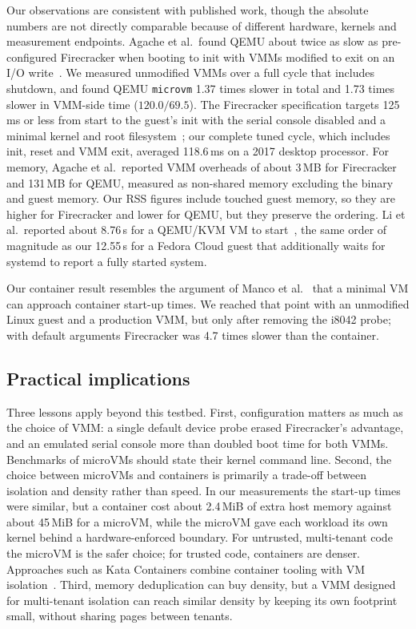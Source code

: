 \documentclass[pdflatex,sn-mathphys-num]{sn-jnl}%
\begin{document}
Our observations are consistent with published work, though the absolute numbers are not directly comparable because of different hardware, kernels and measurement endpoints. Agache et al.\ found QEMU about twice as slow as pre-configured Firecracker when booting to init with VMMs modified to exit on an I/O write~\cite{agache2020firecracker}. We measured unmodified VMMs over a full cycle that includes shutdown, and found QEMU \texttt{microvm} 1.37 times slower in total and 1.73 times slower in VMM-side time ($120.0/69.5$). The Firecracker specification targets 125\,ms or less from start to the guest's init with the serial console disabled and a minimal kernel and root filesystem~\cite{fcspec}; our complete tuned cycle, which includes init, reset and VMM exit, averaged 118.6\,ms on a 2017 desktop processor. For memory, Agache et al.\ reported VMM overheads of about 3\,MB for Firecracker and 131\,MB for QEMU, measured as non-shared memory excluding the binary and guest memory. Our RSS figures include touched guest memory, so they are higher for Firecracker and lower for QEMU, but they preserve the ordering. Li et al.\ reported about 8.76\,s for a QEMU/KVM VM to start~\cite{li2021lightweight}, the same order of magnitude as our 12.55\,s for a Fedora Cloud guest that additionally waits for systemd to report a fully started system.

Our container result resembles the argument of Manco et al.~\cite{manco2017lightvm} that a minimal VM can approach container start-up times. We reached that point with an unmodified Linux guest and a production VMM, but only after removing the i8042 probe; with default arguments Firecracker was 4.7 times slower than the container.

\subsection{Practical implications}

Three lessons apply beyond this testbed. First, configuration matters as much as the choice of VMM: a single default device probe erased Firecracker's advantage, and an emulated serial console more than doubled boot time for both VMMs. Benchmarks of microVMs should state their kernel command line. Second, the choice between microVMs and containers is primarily a trade-off between isolation and density rather than speed. In our measurements the start-up times were similar, but a container cost about 2.4\,MiB of extra host memory against about 45\,MiB for a microVM, while the microVM gave each workload its own kernel behind a hardware-enforced boundary. For untrusted, multi-tenant code the microVM is the safer choice; for trusted code, containers are denser. Approaches such as Kata Containers combine container tooling with VM isolation~\cite{katacontainers}. Third, memory deduplication can buy density, but a VMM designed for multi-tenant isolation can reach similar density by keeping its own footprint small, without sharing pages between tenants.
\end{document}
